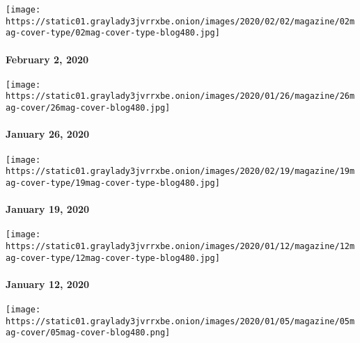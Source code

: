 \href{https://www.nytimes3xbfgragh.onion/issue/magazine/2020/01/30/the-2220-issue}{}

\texttt{[image: https://static01.graylady3jvrrxbe.onion/images/2020/02/02/magazine/02mag-cover-type/02mag-cover-type-blog480.jpg]}

\hypertarget{february-2-2020}{%
\paragraph{February 2, 2020}\label{february-2-2020}}

\href{https://www.nytimes3xbfgragh.onion/issue/magazine/2020/01/23/the-12620-issue}{}

\texttt{[image: https://static01.graylady3jvrrxbe.onion/images/2020/01/26/magazine/26mag-cover/26mag-cover-blog480.jpg]}

\hypertarget{january-26-2020}{%
\paragraph{January 26, 2020}\label{january-26-2020}}

\href{https://www.nytimes3xbfgragh.onion/issue/magazine/2020/01/21/the-11920-issue}{}

\texttt{[image: https://static01.graylady3jvrrxbe.onion/images/2020/02/19/magazine/19mag-cover-type/19mag-cover-type-blog480.jpg]}

\hypertarget{january-19-2020}{%
\paragraph{January 19, 2020}\label{january-19-2020}}

\href{https://www.nytimes3xbfgragh.onion/issue/magazine/2020/01/09/the-11220-issue}{}

\texttt{[image: https://static01.graylady3jvrrxbe.onion/images/2020/01/12/magazine/12mag-cover-type/12mag-cover-type-blog480.jpg]}

\hypertarget{january-12-2020}{%
\paragraph{January 12, 2020}\label{january-12-2020}}

\href{https://www.nytimes3xbfgragh.onion/issue/magazine/2020/01/02/the-1520-issue}{}

\texttt{[image: https://static01.graylady3jvrrxbe.onion/images/2020/01/05/magazine/05mag-cover/05mag-cover-blog480.png]}

